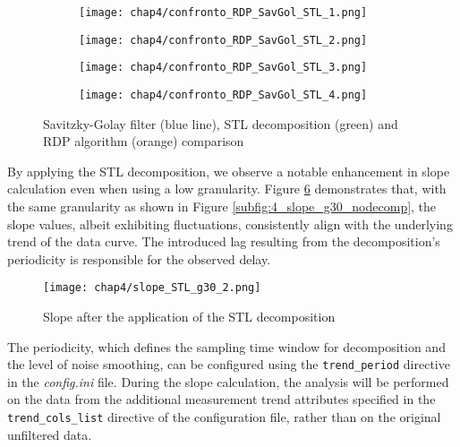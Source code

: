 \begin{figure}[H]
	\centering
	\begin{subfigure}{0.48\textwidth}
		\texttt{[image: chap4/confronto\_RDP\_SavGol\_STL\_1.png]}
		\caption{}
		\label{subfig:4_smoothing1}
	\end{subfigure}
	\hfill
	\begin{subfigure}{0.48\textwidth}
		\texttt{[image: chap4/confronto\_RDP\_SavGol\_STL\_2.png]}
		\caption{}
		\label{subfig:4_smoothing2}
	\end{subfigure}
	\begin{subfigure}{0.48\textwidth}
		\texttt{[image: chap4/confronto\_RDP\_SavGol\_STL\_3.png]}
		\caption{}
		\label{subfig:4_smoothing3}
	\end{subfigure}
	\hfill
	\begin{subfigure}{0.48\textwidth}
		\texttt{[image: chap4/confronto\_RDP\_SavGol\_STL\_4.png]}
		\caption{}
		\label{subfig:4_smoothing4}
	\end{subfigure}
	\caption{Savitzky-Golay filter (blue line), STL decomposition (green) and RDP algorithm (orange) comparison}
	\label{fig:4_smoothing_comparison}
\end{figure}

By applying the STL decomposition, we observe a notable enhancement in slope calculation even when using a low granularity. Figure \ref{fig:4_STL_decomp_results} demonstrates that, with the same granularity as shown in Figure \ref{subfig:4_slope_g30_nodecomp}, the slope values, albeit exhibiting fluctuations, consistently align with the underlying trend of the data curve. The introduced lag resulting from the decomposition's periodicity is responsible for the observed delay.

\begin{figure}[ht]
	\centering
	\texttt{[image: chap4/slope\_STL\_g30\_2.png]}
	\caption{Slope after the application of the STL decomposition}
	\label{fig:4_STL_decomp_results}
\end{figure}

The periodicity, which defines the sampling time window for decomposition and the level of noise smoothing, can be configured using the \texttt{trend\_period} directive in the \textit{config.ini} file.\newline
During the slope calculation, the analysis will be performed on the data from the additional measurement trend attributes specified in the \texttt{trend\_cols\_list} directive of the configuration file, rather than on the original unfiltered data.

